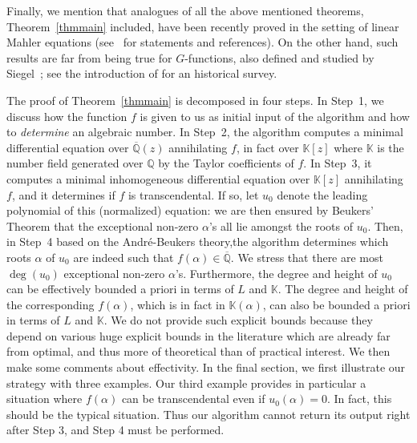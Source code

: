 \documentclass[reqno,english,12pt,a4paper]{smfart}
\numberwithin{equation}{section}
\def\Qbar{\overline{\mathbb Q}}
\def\K{\mathbb K}
\begin{document}
\medskip





Finally, we mention that analogues of all the above mentioned theorems, Theorem~\ref{thmmain} included,  have been recently proved in the setting of linear Mahler equations (see~\cite{af1, af2, pph} for statements and references). On the other hand, such results are far from being true for $G$-functions, also defined and studied by Siegel~\cite{Siegel}; see the introduction of \cite{gfndio} for an historical survey.



\medskip

The proof of Theorem~\ref{thmmain} is decomposed in four steps. In Step~1, we discuss how the function $f$ is given to us as initial input of the algorithm and how to \emph{determine} an algebraic number.  
In Step~2, the algorithm computes a minimal differential equation over $\Qbar(z)$ annihilating $f$, in fact over $\K[z]$ where $\K$ is the number field generated over $\mathbb Q$ by the Taylor coefficients of $f$. In Step~3, it computes a minimal inhomogeneous differential equation over $\K[z]$  annihilating $f$, and it determines if $f$ is transcendental. If so, let $u_0$ denote the leading polynomial of this (normalized) equation: we are then ensured by Beukers' Theorem that the exceptional non-zero $\alpha$'s all lie amongst the roots of $u_0$. 
Then, in Step~4 based on the Andr\'e-Beukers theory,the algorithm determines which roots $\alpha$ of $u_0$ are indeed such that $f(\alpha)\in \Qbar$. 
We stress that there are most $\deg(u_0)$ exceptional non-zero $\alpha$'s. Furthermore, the degree and height of  $u_0$ can  be effectively bounded a priori in terms of $L$ and $\K$. The degree and height of the corresponding $f(\alpha)$, which is in fact in $\K(\alpha)$, can also be bounded a priori in terms of $L$ and $\K$. We do not provide such explicit bounds because they depend on various huge explicit bounds 
in the literature which are already far from optimal, and thus more of theoretical than of practical interest. 
We then make some comments about effectivity. In the final section, we first illustrate our strategy with three examples. Our third example provides in particular a situation  
where $f(\alpha)$ can be transcendental even if $u_0(\alpha)=0$. In fact, this should be the typical situation. 
Thus our algorithm cannot return its output right after Step 3, and Step 4 must be performed. 

\medskip
\end{document}
